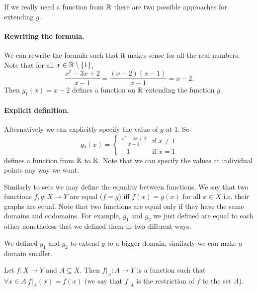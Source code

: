 If we really need a function from $\mathbb{R}$ there are two possible approaches for
extending $g$.

\paragraph{Rewriting the formula.}
We can rewrite the formula such that it makes sense for all the real numbers.
Note that for all $x \in \R \setminus \set{1}$,
\[
  \frac{x^2 - 3x + 2}{x - 1} = \frac{(x - 2)(x - 1)}{x - 1} = x - 2.
\]
Then $g_1(x) = x - 2$ defines a function on $\mathbb{R}$ extending the function $g$.

\paragraph{Explicit definition.} Alternatively we can explicitly specify the
value of $g$ at $1$. So
\[
  g_2(x) =
  \begin{cases}
    \frac{x^2 - 3x + 2}{x - 1} & \text{if } x \neq 1 \\
    -1 & \text{if } x = 1
  \end{cases}
\]
defines a function from $\mathbb{R}$ to $\mathbb{R}$. Note that we can specify the values at
individual points any way we want.

Similarly to sets we may define the equality between functions. We say that two
functions $f, g : X \to Y$ are equal ($f = g$) iff $f(x) = g(x)$ for all
$x \in X$ i.e. their graphs are equal. Note that two functions are equal only
if they have the same domains and codomains. For example, $g_1$ and $g_2$ we
just defined are equal to each other nonetheless that we defined them in two
different ways.

We defined $g_1$ and $g_2$ to extend $g$ to a bigger domain, similarly we can
make a domain smaller.
\begin{definition}
  Let $f : X \to Y$ and $A \subseteq X$. Then $f|_{A} : A \to Y$ is a function
  such that $\forall x \in A\ f|_{A}(x) = f(x)$ (we say that $f|_A$ is the
  restriction of $f$ to the set $A$).
\end{definition}


